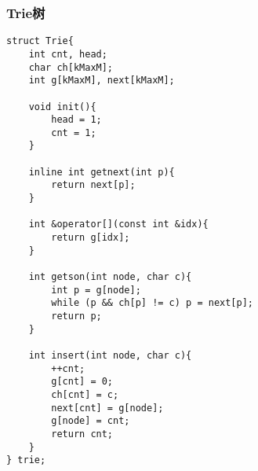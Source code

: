\subsubsection{Trie树}
\begin{verbatim}
struct Trie{
    int cnt, head;
    char ch[kMaxM];
    int g[kMaxM], next[kMaxM];

    void init(){
        head = 1;
        cnt = 1;
    }

    inline int getnext(int p){
        return next[p];
    }

    int &operator[](const int &idx){
        return g[idx];
    }

    int getson(int node, char c){
        int p = g[node];
        while (p && ch[p] != c) p = next[p];
        return p;
    }

    int insert(int node, char c){
        ++cnt;
        g[cnt] = 0;
        ch[cnt] = c;
        next[cnt] = g[node];
        g[node] = cnt;
        return cnt;
    }
} trie;

\end{verbatim}

